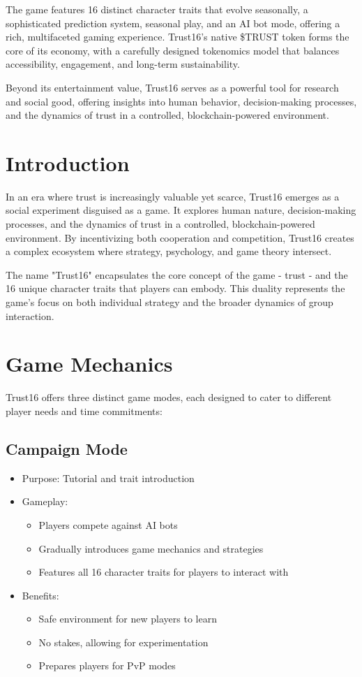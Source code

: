\documentclass[]{article}
\begin{document}
The game features 16 distinct character traits that evolve seasonally, a sophisticated prediction system, seasonal play, and an AI bot mode, offering a rich, multifaceted gaming experience. Trust16's native \$TRUST token forms the core of its economy, with a carefully designed tokenomics model that balances accessibility, engagement, and long-term sustainability.

Beyond its entertainment value, Trust16 serves as a powerful tool for research and social good, offering insights into human behavior, decision-making processes, and the dynamics of trust in a controlled, blockchain-powered environment.

\section{Introduction}

In an era where trust is increasingly valuable yet scarce, Trust16 emerges as a social experiment disguised as a game. It explores human nature, decision-making processes, and the dynamics of trust in a controlled, blockchain-powered environment. By incentivizing both cooperation and competition, Trust16 creates a complex ecosystem where strategy, psychology, and game theory intersect.

The name "Trust16" encapsulates the core concept of the game - trust - and the 16 unique character traits that players can embody. This duality represents the game's focus on both individual strategy and the broader dynamics of group interaction.

\section{Game Mechanics}

Trust16 offers three distinct game modes, each designed to cater to different player needs and time commitments:

\subsection{Campaign Mode}

\begin{itemize}
\item Purpose: Tutorial and trait introduction
\item Gameplay:
  \begin{itemize}
  \item Players compete against AI bots
  \item Gradually introduces game mechanics and strategies
  \item Features all 16 character traits for players to interact with
  \end{itemize}
\item Benefits:
  \begin{itemize}
  \item Safe environment for new players to learn
  \item No stakes, allowing for experimentation
  \item Prepares players for PvP modes
  \end{itemize}
\end{itemize}
\end{document}
